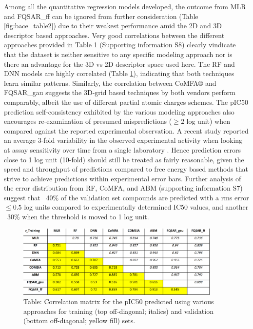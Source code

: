 Among all the quantitative regression models developed, the outcome from MLR and FQSAR\_ff can be ignored from further consideration (Table \ref{fig:bace_table2}) due to their weakest performance amid the 2D and 3D descriptor based approaches.  Very good correlations between the different approaches provided in Table \ref{fig:bace_table4} (Supporting information S8) clearly vindicate that the dataset is neither sensitive to any specific modeling approach nor is there an advantage for the 3D vs 2D descriptor space used here.  The RF and DNN models are highly correlated (Table \ref{fig:bace_table4}), indicating that both techniques learn similar patterns.  Similarly, the correlation between CoMFA® and FQSAR\_gau suggests the 3D-grid based techniques by both vendors perform comparably, albeit the use of different partial atomic charges schemes.  The pIC50 prediction self-consistency exhibited by the various modeling approaches also encourages re-examination of presumed mispredictions ($\geq 2$ log unit) when compared against the reported experimental observation.  A recent study reported an average 3-fold variability in the observed experimental activity when looking at assay sensitivity over time from a single laboratory \cite{kramer2016comprehensive}.  Hence prediction errors close to 1 log unit (10-fold) should still be treated as fairly reasonable, given the speed and throughput of predictions compared to free energy based methods \cite{wang2015accurate} that strive to achieve predictions within experimental error bars.  Further analysis of the error distribution from RF, CoMFA, and ABM (supporting information S7) suggest that ~40\% of the validation set compounds are predicted with a rms error $\leq 0.5$ log units compared to experimentally determined IC50 values, and another ~30\% when the threshold is moved to 1 log unit.  

\begin{figure}
  \centering
  \includegraphics[width=0.9\textwidth]{Images/bace_table_4.png}
  \caption{Table: Correlation matrix for the pIC50 predicted using various approaches for training (top off-diagonal; italics) and validation (bottom off-diagonal; yellow fill) sets.}
  \label{fig:bace_table4}
\end{figure}

